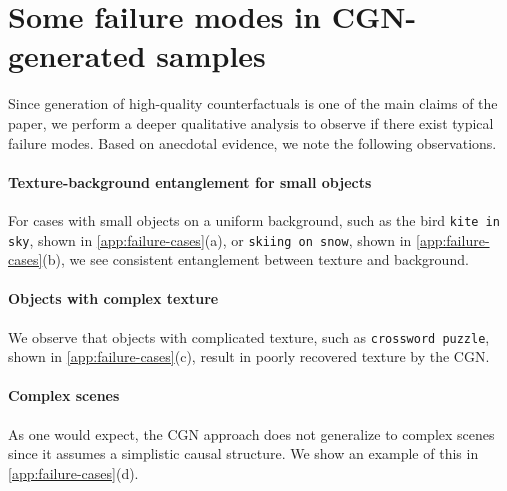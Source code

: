 \section{Some failure modes in CGN-generated samples}
\label{app:failure-modes}
Since  generation of high-quality counterfactuals is one of the main claims of the paper, we perform a deeper qualitative analysis to observe if there exist typical failure modes. Based on anecdotal evidence, we note the following observations.

\paragraph{Texture-background entanglement for small objects}
For cases with small objects on a uniform background, such as the bird \texttt{kite in sky}, shown in \cref{app:failure-cases}(a), or \texttt{skiing on snow}, shown in \cref{app:failure-cases}(b), we see consistent entanglement between texture and background.

\paragraph{Objects with complex texture}
We observe that objects with complicated texture, such as \texttt{crossword puzzle}, shown in \cref{app:failure-cases}(c), result in poorly recovered texture by the CGN.

\paragraph{Complex scenes}
As one would expect, the CGN approach does not generalize to complex scenes since it assumes a simplistic causal structure. We show an example of this in \cref{app:failure-cases}(d).


